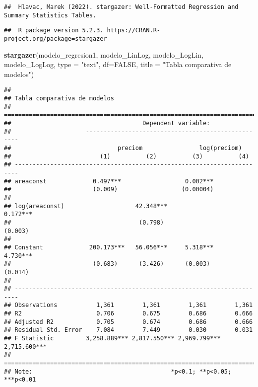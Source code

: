 \documentclass[
]{article}
\newenvironment{Shaded}{\begin{snugshade}}{\end{snugshade}}
\newcommand{\AttributeTok}[1]{\textcolor[rgb]{0.13,0.29,0.53}{#1}}
\newcommand{\ConstantTok}[1]{\textcolor[rgb]{0.56,0.35,0.01}{#1}}
\newcommand{\FunctionTok}[1]{\textcolor[rgb]{0.13,0.29,0.53}{\textbf{#1}}}
\newcommand{\NormalTok}[1]{#1}
\newcommand{\StringTok}[1]{\textcolor[rgb]{0.31,0.60,0.02}{#1}}
\begin{document}
\begin{verbatim}
##  Hlavac, Marek (2022). stargazer: Well-Formatted Regression and Summary Statistics Tables.
\end{verbatim}

\begin{verbatim}
##  R package version 5.2.3. https://CRAN.R-project.org/package=stargazer
\end{verbatim}

\begin{Shaded}
\begin{Highlighting}[]
\FunctionTok{stargazer}\NormalTok{(modelo\_regresion1, modelo\_LinLog, modelo\_LogLin, modelo\_LogLog, }\AttributeTok{type =} \StringTok{"text"}\NormalTok{, }\AttributeTok{df=}\ConstantTok{FALSE}\NormalTok{, }\AttributeTok{title =} \StringTok{"Tabla comparativa de modelos"}\NormalTok{)}
\end{Highlighting}
\end{Shaded}

\begin{verbatim}
## 
## Tabla comparativa de modelos
## =======================================================================
##                                     Dependent variable:                
##                     ---------------------------------------------------
##                              preciom                log(preciom)       
##                         (1)          (2)          (3)          (4)     
## -----------------------------------------------------------------------
## areaconst             0.497***                  0.002***               
##                       (0.009)                  (0.00004)               
##                                                                        
## log(areaconst)                    42.348***                  0.172***  
##                                    (0.798)                   (0.003)   
##                                                                        
## Constant             200.173***   56.056***     5.318***     4.730***  
##                       (0.683)      (3.426)      (0.003)      (0.014)   
##                                                                        
## -----------------------------------------------------------------------
## Observations           1,361        1,361        1,361        1,361    
## R2                     0.706        0.675        0.686        0.666    
## Adjusted R2            0.705        0.674        0.686        0.666    
## Residual Std. Error    7.084        7.449        0.030        0.031    
## F Statistic         3,258.889*** 2,817.550*** 2,969.799*** 2,715.600***
## =======================================================================
## Note:                                       *p<0.1; **p<0.05; ***p<0.01
\end{verbatim}
\end{document}
